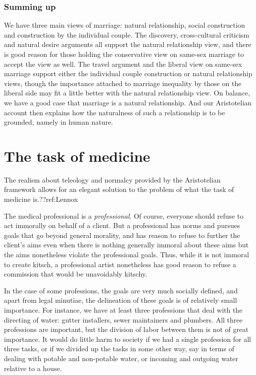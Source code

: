 \subsubsection{Summing up}
We have three main views of marriage: natural relationship, social construction and construction by the individual couple. 
The discovery, cross-cultural criticism and natural desire arguments all support the natural relationship view, and 
there is good reason for those holding the conservative view on same-sex marriage to accept the view as well. 
The travel argument and the liberal view on same-sex marriage support either the individual couple construction or 
natural relationship views, though the importance attached to marriage inequality by those on the liberal side may 
fit a little better with the natural relationship view. On balance, we have a good case that marriage is a natural
relationship. And our Aristotelian account then explains how the naturalness of such a relationship is to be grounded, 
namely in human nature. 

\section{The task of medicine}
The realism about teleology and normalcy provided by the Aristotelian framework
allows for an elegant solution to the problem of what the task of medicine is.??ref:Lennox

The medical professional is a \textit{professional}. Of course, everyone should refuse to act immorally on behalf of a client. But a professional has norms
and pursues goals that go beyond general morality, and has reason to refuse to further the client's aims even when there is nothing generally immoral about
these aims but the aims nonetheless violate the professional goals. Thus, while it is not immoral to create kitsch, a professional artist nonetheless has good reason
to refuse a commission that would be unavoidably kitschy.

In the case of some professions, the goals are very much socially defined, and apart from legal minutiae, the delineation of these goals is of relatively
small importance. For instance, we have at least three professions that deal with the directing of water: gutter installers, sewer maintainers and plumbers.
All three professions are important, but the division of labor between them is not of great importance. It would do little harm to society if we had a single
profession for all three tasks, or if we divided up the tasks in some other way, say in terms of dealing with potable and non-potable water, or incoming
and outgoing water relative to a house.

